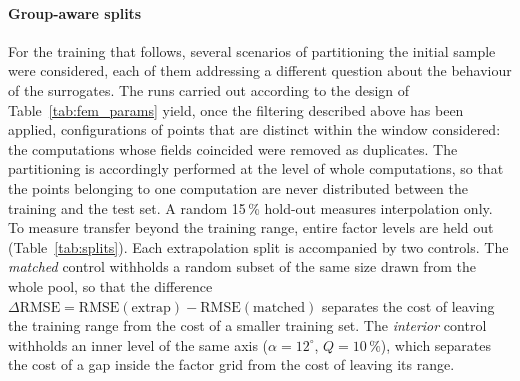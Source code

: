 \documentclass[subscriptcorrection,upint,varvw,barcolor=Goldenrod3,mathalfa=cal=euler,balance,hyphenate,french,pdf-a]{asmejour} %
\begin{document}
\paragraph{Group-aware splits}
For the training that follows, several scenarios of partitioning the initial sample were considered, each of them addressing a different question about the behaviour of the surrogates.
The runs carried out according to the design of Table~\ref{tab:fem_params} yield, once the filtering described above has been applied, configurations of points that are distinct within the window considered: the computations whose fields coincided were removed as duplicates. The partitioning is accordingly performed at the level of whole computations, so that the points belonging to one computation are never distributed between the training and the test set. %
A random 15\,\% hold-out measures interpolation only. To measure transfer beyond the training range, entire factor levels are held out (Table~\ref{tab:splits}). %
Each extrapolation split is accompanied by two controls. The \emph{matched} control withholds a random subset of the same size drawn from the whole pool, so that the difference $\Delta\mathrm{RMSE} = \mathrm{RMSE}(\text{extrap}) - \mathrm{RMSE}(\text{matched})$ separates the cost of leaving the training range from the cost of a smaller training set. %
The \emph{interior} control withholds an inner level of the same axis ($\alpha = 12^\circ$, $Q = 10\,\%$), which separates the cost of a gap inside the factor grid from the cost of leaving its range. %
\end{document}
